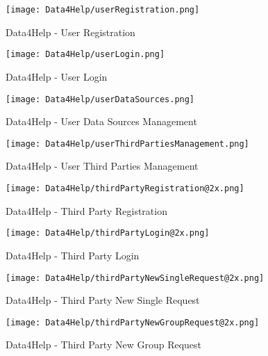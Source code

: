 \graphicspath{ {../Mockups/} }



\begin{figure}
  \texttt{[image: Data4Help/userRegistration.png]}
  \caption{Data4Help - User Registration}
  \label{Data4Help - User Registration}
\end{figure}

\begin{figure}
  \texttt{[image: Data4Help/userLogin.png]}
  \caption{Data4Help - User Login}
  \label{Data4Help - User Login}
\end{figure}

\begin{figure}
  \texttt{[image: Data4Help/userDataSources.png]}
  \caption{Data4Help - User Data Sources Management}
  \label{Data4Help - User Data Sources Management}
\end{figure}

\begin{figure}
  \texttt{[image: Data4Help/userThirdPartiesManagement.png]}
  \caption{Data4Help - User Third Parties Management}
  \label{Data4Help - User Third Parties Management}
\end{figure}


\begin{figure}
  \texttt{[image: Data4Help/thirdPartyRegistration@2x.png]}
  \caption{Data4Help - Third Party Registration}
  \label{Data4Help - Third Party Registration}
\end{figure}

\begin{figure}
  \texttt{[image: Data4Help/thirdPartyLogin@2x.png]}
  \caption{Data4Help - Third Party Login}
  \label{Data4Help - Third Party Login}
\end{figure}

\begin{figure}
  \texttt{[image: Data4Help/thirdPartyNewSingleRequest@2x.png]}
  \caption{Data4Help - Third Party New Single Request}
  \label{Data4Help - Third Party New Single Request}
\end{figure}

\begin{figure}
  \texttt{[image: Data4Help/thirdPartyNewGroupRequest@2x.png]}
  \caption{Data4Help - Third Party New Group Request}
  \label{Data4Help - Third Party New Group Request}
\end{figure} 

